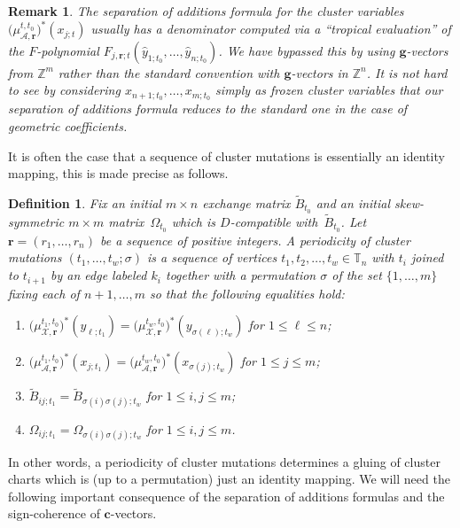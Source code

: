 \documentclass{amsart}
\newtheorem{definition}[theorem]{Definition}
\newtheorem{remark}[theorem]{Remark}
\numberwithin{equation}{section}
\newcommand{\bfc}{\mathbf{c}}
\newcommand{\bfg}{\mathbf{g}}
\newcommand{\bfr}{{\boldsymbol{r}}}
\newcommand{\cA}{\mathcal{A}}
\newcommand{\cX}{\mathcal{X}}
\newcommand{\TT}{\mathbb{T}}
\newcommand{\ZZ}{\mathbb{Z}}
\begin{document}
\begin{remark}
  The separation of additions formula for the cluster variables $\big(\mu_{\cA,\bfr}^{t,t_0}\big)^*(x_{j;t})$ usually has a denominator computed via a ``tropical evaluation'' of the $F$-polynomial $F_{j,\bfr;t}(\hat y_{1;t_0},\ldots,\hat y_{n;t_0})$.
  We have bypassed this by using $\bfg$-vectors from $\ZZ^m$ rather than the standard convention with $\bfg$-vectors in $\ZZ^n$.
  It is not hard to see by considering $x_{n+1;t_0}, \ldots, x_{m;t_0}$ simply as frozen cluster variables that our separation of additions formula reduces to the standard one in the case of geometric coefficients.
\end{remark}

It is often the case that a sequence of cluster mutations is essentially an identity mapping, this is made precise as follows.
\begin{definition}
  \label{def:periodicity}
  Fix an initial $m\times n$ exchange matrix $\tilde B_{t_0}$ and an initial skew-symmetric $m\times m$ matrix~$\Omega_{t_0}$ which is $D$-compatible with~$\tilde B_{t_0}$.
  Let $\bfr=(r_1,\ldots,r_n)$ be a sequence of positive integers.
  A \emph{periodicity of cluster mutations} $(t_1,\ldots,t_w;\sigma)$ is a sequence of vertices $t_1,t_2,\ldots,t_w\in\TT_n$ with $t_i$ joined to $t_{i+1}$ by an edge labeled $k_i$ together with a permutation $\sigma$ of the set $\{1,\ldots,m\}$ fixing each of $n+1,\ldots,m$ so that the following equalities hold:
  \begin{enumerate}
    \item $\big(\mu_{\cX,\bfr}^{t_1,t_0}\big)^*(y_{\ell;t_1})=\big(\mu_{\cX,\bfr}^{t_w,t_0}\big)^*(y_{\sigma(\ell);t_w})$ for $1\le\ell\le n$;
    \item $\big(\mu_{\cA,\bfr}^{t_1,t_0}\big)^*(x_{j;t_1})=\big(\mu_{\cA,\bfr}^{t_w,t_0}\big)^*(x_{\sigma(j);t_w})$ for $1\le j\le m$;
    \item $\tilde B_{ij;t_1}=\tilde B_{\sigma(i)\sigma(j);t_w}$ for $1\le i,j\le m$;
    \item $\Omega_{ij;t_1}=\Omega_{\sigma(i)\sigma(j);t_w}$ for $1\le i,j\le m$.
  \end{enumerate}
\end{definition}
In other words, a periodicity of cluster mutations determines a gluing of cluster charts which is (up to a permutation) just an identity mapping.
We will need the following important consequence of the separation of additions formulas and the sign-coherence of $\bfc$-vectors.
\end{document}
